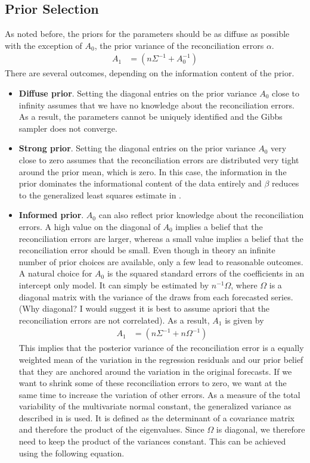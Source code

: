 \documentclass[a4paper,fleqn,11pt]{article}
\begin{document}
\subsection{Prior Selection}
As noted before, the priors for the parameters should be as diffuse as possible with the exception of $A_0$, the prior variance of the reconciliation errors $\alpha$. 
\begin{align*}
	A_1 &= \left(n\Sigma^{-1} + A_0^{-1}\right)
\end{align*}
There are several outcomes, depending on the information content of the prior.
\begin{itemize}
    \item\textbf{Diffuse prior}. Setting the diagonal entries on the prior variance $A_0$ close to infinity assumes that we have no knowledge about the reconciliation errors. As a result, the parameters cannot be uniquely identified and the Gibbs sampler does not converge.
    \item \textbf{Strong prior}. Setting the diagonal entries on the prior variance $A_0$ very close to zero assumes that the reconciliation errors are distributed very tight around the prior mean, which is zero. In this case, the information in the prior dominates the informational content of the data entirely and $\beta$ reduces to the generalized least squares estimate in \cite{Hyndman2016}. 
    \item \textbf{Informed prior}. $A_0$ can also reflect prior knowledge about the reconciliation errors. A high value on the diagonal of $A_0$ implies a belief that the reconciliation errors are larger, whereas a small value implies a belief that the reconciliation error should be small. Even though in theory an infinite number of prior choices are available, only a few lead to reasonable outcomes.\\
    A natural choice for $A_0$ is the squared standard errors of the coefficients in an intercept only model. It can simply be estimated by $n^{-1}\Omega$, where $\Omega $ is a diagonal matrix with the variance of the draws from each forecasted series. (Why diagonal? I would suggest it is best to assume apriori that the reconciliation errors are not correlated). As a result, $A_1$ is given by
\begin{align*}
	A_1 &= \left(n\Sigma^{-1} + n\Omega^{-1} \right)
\end{align*}
    This implies that the posterior variance of the reconciliation error is a equally weighted mean of the variation in the regression residuals and our prior belief that they are anchored around the variation in the original forecasts. If we want to shrink some of these reconciliation errors to zero, we want at the same time to increase the variation of other errors. As a measure of the total variability of the multivariate normal constant, the generalized variance as described in \cite{Mutonen1997} is used. It is defined as the determinant of a covariance matrix and therefore the product of the eigenvalues. Since $\Omega$ is diagonal, we therefore need to keep the product of the variances constant. This can be achieved using the following equation.

\end{itemize}
\end{document}
